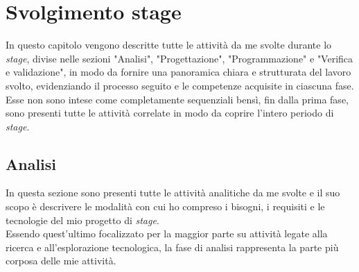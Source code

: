 \chapter{Svolgimento stage}
\label{cap:svolgimentoStage}
In questo capitolo vengono descritte tutte le attività da me svolte durante lo \emph{stage}, divise nelle sezioni "Analisi", "Progettazione", "Programmazione" e "Verifica e validazione", in modo da fornire una panoramica chiara e strutturata del lavoro svolto, evidenziando il processo seguito e le competenze acquisite in ciascuna fase.\\
Esse non sono intese come completamente sequenziali bensì, fin dalla prima fase, sono presenti tutte le attività correlate in modo da coprire l'intero periodo di \emph{stage}.\\
\section{Analisi}
In questa sezione sono presenti tutte le attività analitiche da me svolte e il suo scopo è descrivere le modalità con cui ho compreso i bisogni, i requisiti e le tecnologie del mio progetto di \emph{stage}.\\
Essendo quest'ultimo focalizzato per la maggior parte su attività legate alla ricerca e all'esplorazione tecnologica, la fase di analisi rappresenta la parte più corposa delle mie attività.\\

